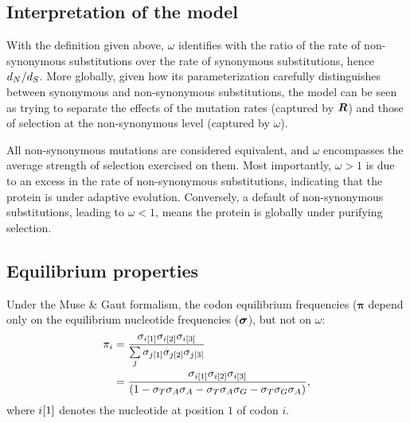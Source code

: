 \subsection{Interpretation of the model}
\label{subsec:interpretation-of-the-model}

With the definition given above, $\omega$ identifies with the ratio of the rate of non-synonymous substitutions over the rate of synonymous substitutions, hence $d_N / d_S$.
More globally, given how its parameterization carefully distinguishes between synonymous and non-synonymous substitutions, the model can be seen as trying to separate the effects of the mutation rates (captured by $\bm{R}$) and those of selection at the non-synonymous level (captured by $\omega$).

All non-synonymous mutations are considered equivalent, and $\omega$ encompasses the average strength of selection exercised on them.
Most importantly, $\omega>1$ is due to an excess in the rate of non-synonymous substitutions, indicating that the protein is under adaptive evolution.
Conversely, a default of non-synonymous substitutions, leading to $\omega<1$, means the protein is globally under purifying selection.

\subsection{Equilibrium properties}
\label{subsec:equilibrium-properties}

Under the Muse \& Gaut formalism, the codon equilibrium frequencies ($\bm{\pi}$ depend only on the equilibrium nucleotide frequencies ($\bm{\sigma}$), but not on $\omega$:
\begin{align}
    \pi_{{i}} & = \dfrac{\sigma_{{i}[1]}\sigma_{{i}[2]}\sigma_{{i}[3]}}{\sum\limits_{{j}}\sigma_{{j}[1]}\sigma_{{j}[2]}\sigma_{{j}[3]} } \\
    & = \dfrac{\sigma_{{i}[1]}\sigma_{{i}[2]}\sigma_{{i}[3]}}{(1 - \sigma_{T}\sigma_{A}\sigma_{A} - \sigma_{T}\sigma_{A}\sigma_{G} - \sigma_{T}\sigma_{G}\sigma_{A} )}, \label{eq:equilibrium-MG}
\end{align}
where ${i}[1]$ denotes the nucleotide at position $1$ of codon $i$.

